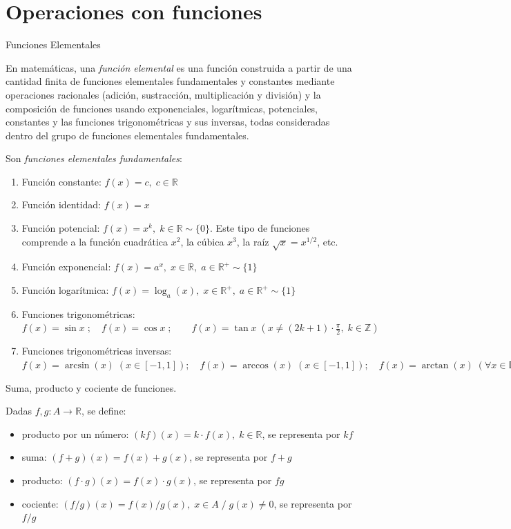 	
	\section{Operaciones con funciones}
		
		\begin{defi}{Funciones Elementales}
		
		En matemáticas, una \emph{función elemental} es una función construida a partir de una cantidad finita de funciones elementales fundamentales y constantes mediante operaciones racionales (adición, sustracción, multiplicación y división) y la composición de funciones usando exponenciales, logarí­tmicas, potenciales, constantes y las funciones trigonométricas y sus inversas, todas consideradas dentro del grupo de funciones elementales fundamentales.
			
		\end{defi}
		
		 Son \emph{funciones elementales fundamentales}:
		
		\begin{enumerate}
			\item Función constante: $f(x)=c,\; c\in \mathbb R$
			\item Función identidad: $f(x)=x$
			\item Función potencial: $f(x)=x^k,\; k\in \mathbb R \sim \{0\}$. Este tipo de funciones comprende a la función cuadrática $x^2$, la cúbica $x^3$, la raí­z $\sqrt x = x^{1/2}$, etc.
			\item Función exponencial: $f(x)=a^x,\; x\in \mathbb R,\; a\in \mathbb R^+ \sim \{ 1 \}$
			\item Función logarí­tmica: $f(x)=\log_a (x),\; x\in \mathbb R^+ ,\; a\in \mathbb R^+ \sim \{ 1 \}$
			\item Funciones trigonométricas: $f(x)=\sin x\; ; \quad f(x)=\cos x\; ; \qquad f(x)=\tan x \;  (x\neq (2k+1) \cdot 	\frac {\pi} {2}, \; k\in \mathbb Z)$
			\item Funciones trigonométricas inversas: $f(x)=\arcsin (x)\; (x\in [-1,1]); \quad f(x)=\arccos (x)\; (x\in [-1,1]); \quad f(x)=\arctan (x)\; (\forall x \in \mathbb R) $
		\end{enumerate}
		
		\begin{defi}{Suma, producto y cociente de funciones}.
			
			
			Dadas $f,g: A \to \mathbb R$, se define:
			
			\begin{itemize}
				\item producto por un número: $(kf)(x)=k\cdot f(x),\; k\in \mathbb R$, se representa por $kf$
				\item suma: $(f+g)(x)=f(x)+g(x)$, se representa por $f+g$
				\item producto: $(f\cdot g)(x)=f(x)\cdot g(x)$, se representa por $fg$
				\item cociente: $(f/g)(x)=f(x)/g(x),\; x\in A\; / \; g(x)\neq 0$, se representa por $f/g$
			\end{itemize}
			
		\end{defi}
		
